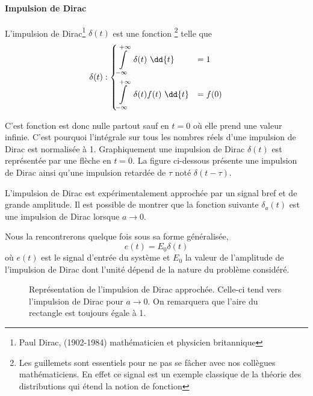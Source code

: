 \paragraph{Impulsion de Dirac}

L'impulsion de Dirac\footnote{Paul Dirac, (1902-1984) 
mathématicien et physicien britannique} $\delta(t)$ est une \og fonction\fg 
\footnote{Les guillemets sont essentiels pour ne pas se fâcher avec 
nos collègues mathématiciens. En effet ce signal est un exemple classique de la 
théorie des distributions qui étend la notion de fonction} telle que
\begin{align*}
\delta(t) : 
\begin{dcases}
	\int\limits_{-\infty}^{+\infty}	 \delta(t)\,\,\dd{t}&=1   \\
\int\limits_{-\infty}^{+\infty}  \delta(t)f(t)\,\,\dd{t}&=f(0)	
\end{dcases}
\end{align*}

C'est fonction est donc nulle partout sauf en $t=0$ où elle prend 
une valeur infinie. C'est pourquoi l'intégrale sur tous les nombres réels 
d'une impulsion de Dirac est normalisée à 1.
Graphiquement une impulsion de Dirac $\delta(t)$ est 
représentée par une flèche en $t=0$. La figure ci-dessous présente 
une impulsion de Dirac ainsi qu'une 
impulsion retardée de $\tau$ noté $\delta(t-\tau)$.

\begin{figure}[!h]
\begin{center}

\end{center}
\end{figure}

L'impulsion de Dirac est expérimentalement approchée par un signal 
bref et de grande amplitude. Il est possible de montrer que la fonction
suivante $\delta_a(t)$ est une impulsion de Dirac lorsque $a\to0$.

Nous la rencontrerons quelque fois sous sa forme généralisée, 
$$
e(t)=E_0\delta(t)
$$
où $e(t)$ est le signal d'entrée du système et $E_0$ la valeur de l'amplitude 
de l'impulsion de Dirac dont l'unité dépend de la nature du problème considéré.
\begin{figure}[!h]
\begin{center}

\caption{Représentation de l'impulsion de Dirac approchée. 
Celle-ci tend vers l'impulsion de Dirac pour $a\to0$. On remarquera 
que l'aire du rectangle est toujours égale à 1.\label{fig-dirac2}}
\end{center}
\end{figure}

